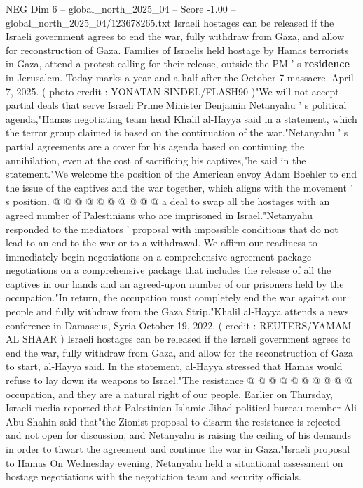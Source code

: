\begin{textsample}{NEG Dim 6 – global\_north\_2025\_04 – Score -1.00 – global\_north\_2025\_04/123678265.txt}  \label{ex:f6_neg_263}
Israeli hostages can be released if the Israeli government agrees to end the war, fully withdraw from Gaza, and allow for reconstruction of Gaza.
Families of Israelis held hostage by Hamas terrorists in Gaza, attend a protest calling for their release, outside the PM ' s \textbf{residence} in Jerusalem.
Today marks a year and a half after the October 7 massacre.
April 7, 2025. ( photo credit : YONATAN SINDEL/FLASH90 )"We will not accept partial deals that serve Israeli Prime Minister Benjamin Netanyahu ' s political agenda,"Hamas negotiating team head Khalil al-Hayya said in a statement, which the terror group claimed is based on the continuation of the war."Netanyahu ' s partial agreements are a cover for his agenda based on continuing the annihilation, even at the cost of sacrificing his captives,"he said in the statement."We welcome the position of the American envoy Adam Boehler to end the issue of the captives and the war together, which aligns with the movement ' s position. @ @ @ @ @ @ @ @ @ @ a deal to swap all the hostages with an agreed number of Palestinians who are imprisoned in Israel."Netanyahu responded to the mediators ' proposal with impossible conditions that do not lead to an end to the war or to a withdrawal.
We affirm our readiness to immediately begin negotiations on a comprehensive agreement package -- negotiations on a comprehensive package that includes the release of all the captives in our hands and an agreed-upon number of our prisoners held by the occupation."In return, the occupation must completely end the war against our people and fully withdraw from the Gaza Strip."Khalil al-Hayya attends a news conference in Damascus, Syria October 19, 2022. ( credit : REUTERS/YAMAM AL SHAAR ) Israeli hostages can be released if the Israeli government agrees to end the war, fully withdraw from Gaza, and allow for the reconstruction of Gaza to start, al-Hayya said.
In the statement, al-Hayya stressed that Hamas would refuse to lay down its weapons to Israel."The resistance @ @ @ @ @ @ @ @ @ @ occupation, and they are a natural right of our people.
Earlier on Thursday, Israeli media reported that Palestinian Islamic Jihad political bureau member Ali Abu Shahin said that"the Zionist proposal to disarm the resistance is rejected and not open for discussion, and Netanyahu is raising the ceiling of his demands in order to thwart the agreement and continue the war in Gaza."Israeli proposal to Hamas On Wednesday evening, Netanyahu held a situational assessment on hostage negotiations with the negotiation team and security officials.

\end{textsample}
